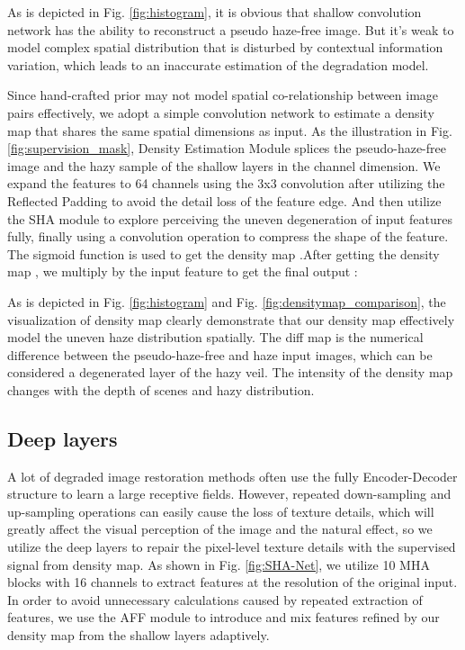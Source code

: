 \documentclass[final]{cvpr}
\begin{document}
As is depicted in Fig. \ref{fig:histogram}, it is obvious that shallow convolution network has the ability to reconstruct a pseudo haze-free image. But it's weak to model complex spatial distribution that is disturbed by contextual information variation, which leads to an inaccurate estimation of the degradation model.

Since hand-crafted prior may not model spatial co-relationship between image pairs effectively, we adopt a simple convolution network to estimate a density map that shares the same spatial dimensions as input. As the illustration in Fig. \ref{fig:supervision_mask}, Density Estimation Module splices the pseudo-haze-free image and the hazy sample of the shallow layers in the channel dimension. We expand the features to 64 channels using the 3x3 convolution after utilizing the Reflected Padding to avoid the detail loss of the feature edge. And then utilize the SHA module to explore perceiving the uneven degeneration of input features fully, finally using a convolution operation to compress the shape of the feature. The sigmoid function is used to get the density map .After getting the density map , we multiply  by the input feature  to get the final output :



As is depicted in Fig. \ref{fig:histogram} and Fig. \ref{fig:densitymap_comparison}, the visualization of density map clearly demonstrate that our density map effectively model the uneven haze distribution spatially. The diff map is the numerical difference between the pseudo-haze-free and haze input images, which can be considered a degenerated layer of the hazy veil. The intensity of the density map changes with the depth of scenes and hazy distribution.
\subsection{Deep layers}
\label{sec:deep_layers}
A lot of degraded image restoration methods \cite{DMPHN,zamir2021multi,msbdn} often use the fully Encoder-Decoder structure to learn a large receptive fields. However, repeated down-sampling and up-sampling operations can easily cause the loss of texture details, which will greatly affect the visual perception of the image and the natural effect, so we utilize the deep layers to repair the pixel-level texture details with the supervised signal from density map. As shown in Fig. \ref{fig:SHA-Net}, we utilize 10 MHA blocks with 16 channels to extract features at the resolution of the original input. In order to avoid unnecessary calculations caused by repeated extraction of features, we use the AFF module to introduce and mix features refined by our density map from the shallow layers adaptively.
\end{document}

